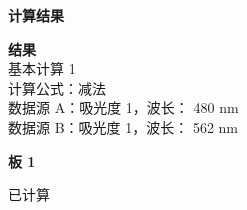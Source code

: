 \documentclass[UTF8,10pt,a4paper,fontset=fandol]{ctexart}
\newcommand{\fieldvalue}[1]{#1}
\begin{document}
\vspace{0.5em}

\textbf{计算结果}

\begin{flushleft}
\textbf{结果}\\
\quad 基本计算 1\\
\quad 计算公式：减法\\
\quad 数据源 A：吸光度 1，波长：
\fieldvalue{480 nm}\\
\quad 数据源 B：吸光度 1，波长：
\fieldvalue{562 nm}
\end{flushleft}

\textbf{板 1}

已计算

\vspace{0.25em}
\end{document}
